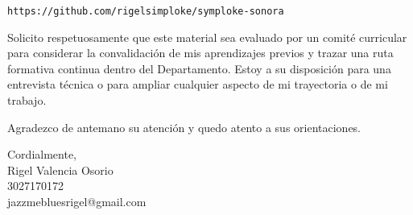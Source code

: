 \documentclass[12pt, a4paper]{article}
\begin{document}
\begin{center}
\texttt{https://github.com/rigelsimploke/symploke-sonora}
\end{center}

Solicito respetuosamente que este material sea evaluado por un comité
curricular para considerar la convalidación de mis aprendizajes previos
y trazar una ruta formativa continua dentro del Departamento. Estoy a
su disposición para una entrevista técnica o para ampliar cualquier
aspecto de mi trayectoria o de mi trabajo.

Agradezco de antemano su atención y quedo atento a sus orientaciones.

\vspace{1cm}

\begin{flushright}
Cordialmente,\\[1em]
Rigel Valencia Osorio\\
3027170172\\
jazzmebluesrigel@gmail.com
\end{flushright}
\end{document}
